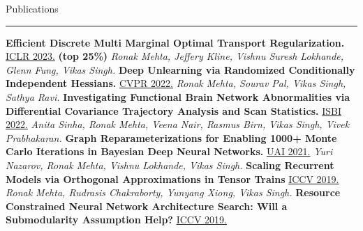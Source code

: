 \documentclass[]{article}
\begin{document}
\iffalse
\vspace{15pt}
{\LARGE Publications}
\vspace{3pt}
\hrule
\vspace{10pt}

\noindent
{\bf Efficient Discrete Multi Marginal Optimal Transport Regularization.}
\newline
\href{https://openreview.net/forum?id=R98ZfMt-jE}{ICLR 2023.}
\textbf{(top 25\%)} \textit{Ronak Mehta, Jeffery Kline, Vishnu Suresh Lokhande, Glenn Fung, Vikas Singh.}
\newline\newline
{\bf Deep Unlearning via Randomized Conditionally Independent Hessians.}
\newline
\href{https://openaccess.thecvf.com/content/CVPR2022/html/Mehta_Deep_Unlearning_via_Randomized_Conditionally_Independent_Hessians_CVPR_2022_paper.html}{CVPR 2022.}
\textit{Ronak Mehta, Sourav Pal, Vikas Singh, Sathya Ravi.}
\newline\newline
{\bf Investigating Functional Brain Network Abnormalities via Differential Covariance Trajectory Analysis and Scan Statistics.}
\newline
\href{https://ieeexplore.ieee.org/document/9761442}{ISBI 2022.}
\textit{Anita Sinha, Ronak Mehta, Veena Nair, Rasmus Birn, Vikas Singh, Vivek Prabhakaran.}
\newline\newline
{\bf Graph Reparameterizations for Enabling 1000+ Monte Carlo Iterations in Bayesian Deep Neural Networks.}
\newline
\href{https://proceedings.mlr.press/v161/nazarovs21b.html}{UAI 2021.}
\textit{Yuri Nazarov, Ronak Mehta, Vishnu Lokhande, Vikas Singh.}
\newline\newline
{\bf Scaling Recurrent Models via Orthogonal Approximations in Tensor Trains}
\newline
\href{http://openaccess.thecvf.com/content_ICCV_2019/html/Mehta_Scaling_Recurrent_Models_via_Orthogonal_Approximations_in_Tensor_Trains_ICCV_2019_paper.html}{ICCV 2019.}
\textit{Ronak Mehta, Rudrasis Chakraborty, Yunyang Xiong, Vikas Singh.}
\newline\newline
{\bf Resource Constrained Neural Network Architecture Search: Will a Submodularity Assumption Help?}
\newline
\href{http://openaccess.thecvf.com/content_ICCV_2019/html/Xiong_Resource_Constrained_Neural_Network_Architecture_Search_Will_a_Submodularity_Assumption_ICCV_2019_paper.html}{ICCV 2019.}
\end{document}
